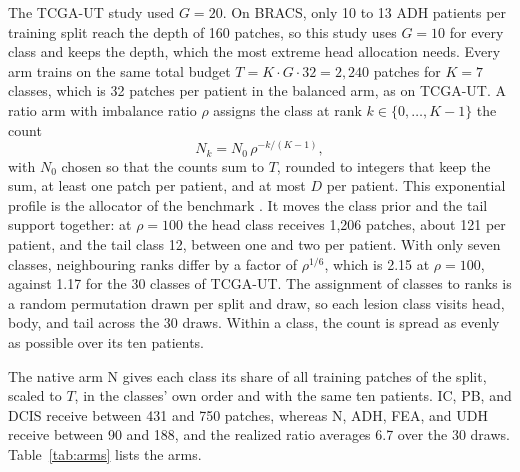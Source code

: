 \documentclass[11pt]{article}
\begin{document}
The TCGA-UT study used $G=20$. On BRACS, only 10 to 13 ADH patients per training split reach the depth of 160 patches, so this study uses $G=10$ for every class and keeps the depth, which the most extreme head allocation needs. Every arm trains on the same total budget $T=K\cdot G\cdot 32=2{,}240$ patches for $K=7$ classes, which is 32 patches per patient in the balanced arm, as on TCGA-UT. A ratio arm with imbalance ratio $\rho$ assigns the class at rank $k\in\{0,\dots,K-1\}$ the count
\begin{equation}
  N_k = N_0\,\rho^{-k/(K-1)},
  \label{eq:profile}
\end{equation}
\noindent with $N_0$ chosen so that the counts sum to $T$, rounded to integers that keep the sum, at least one patch per patient, and at most $D$ per patient. This exponential profile is the allocator of the benchmark \citep{queisler2026benchmarkProtocol}. It moves the class prior and the tail support together: at $\rho=100$ the head class receives 1,206 patches, about 121 per patient, and the tail class 12, between one and two per patient. With only seven classes, neighbouring ranks differ by a factor of $\rho^{1/6}$, which is 2.15 at $\rho=100$, against 1.17 for the 30 classes of TCGA-UT. The assignment of classes to ranks is a random permutation drawn per split and draw, so each lesion class visits head, body, and tail across the 30 draws. Within a class, the count is spread as evenly as possible over its ten patients.

The native arm N gives each class its share of all training patches of the split, scaled to $T$, in the classes' own order and with the same ten patients. IC, PB, and DCIS receive between 431 and 750 patches, whereas N, ADH, FEA, and UDH receive between 90 and 188, and the realized ratio averages 6.7 over the 30 draws. Table~\ref{tab:arms} lists the arms.
\end{document}

